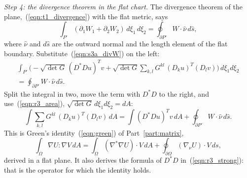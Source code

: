 \emph{Step 4: the divergence theorem in the flat chart.} The divergence theorem of the plane,~(\ref{eqn:t1_divergence}) with the flat metric, says
\begin{equation*}
\int_{P'} (\partial_1 W_1 + \partial_2 W_2)\, d\xi_1\, d\xi_2 = \oint_{\partial P'} W\cdot\hat\nu\, d\hat s ,
\end{equation*}
where $\hat\nu$ and $d\hat s$ are the outward normal and the length element of the flat boundary. Substitute~(\ref{eqn:s3a_divW}) on the left:
\begin{multline*}
\int_{P'} \Big(-\sqrt{\det G}\,(D^*Du)^Tv + \sqrt{\det G}\sum_{k,l} G^{kl}\,(D_ku)^T(D_lv)\Big)\, d\xi_1 d\xi_2 \\
= \oint_{\partial P'} W\cdot\hat\nu\, d\hat s .
\end{multline*}
Split the integral in two, move the term with $D^*D$ to the right, and use~(\ref{eqn:r3_area}), $\sqrt{\det G}\,d\xi_1 d\xi_2 = dA$:
\begin{equation}
\label{eqn:r3_green}
\int \sum_{k,l} G^{kl}\,(D_ku)^T(D_lv)\, dA = \int (D^*Du)^Tv\, dA + \oint_{\partial P'} W\cdot\hat\nu\, d\hat s .
\end{equation}
This is Green's identity~(\ref{eqn:green}) of Part~\ref{part:matrix},
\begin{equation*}
\int_\Omega \nabla U : \nabla V\, dA = \int_\Omega (\nabla^* \nabla U) \cdot V\, dA + \oint_{\partial \Omega} (\nabla_\nu U) \cdot V\, ds ,
\end{equation*}
derived in a flat plane. It also derives the formula of $D^*D$ in~(\ref{eqn:r3_strong}): that is the operator for which the identity holds.

